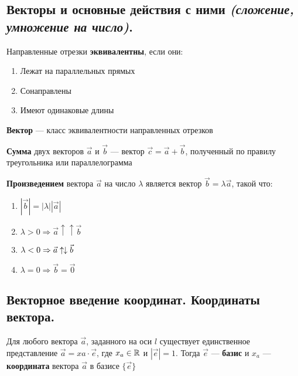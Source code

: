 \subsection{Векторы и основные действия с ними \textit{(сложение, умножение на число)}.}
\begin{definition}
    Направленные отрезки \textbf{эквивалентны}, если они:
    \begin{enumerate}
        \item Лежат на параллельных прямых
        \item Сонаправлены
        \item Имеют одинаковые длины
    \end{enumerate}
\end{definition}
\begin{definition}
    \textbf{Вектор} --- класс эквивалентности направленных отрезков
\end{definition}
\begin{definition}
    \textbf{Сумма} двух векторов $\vec a$ и $\vec b$ --- вектор $\vec c=\vec a + \vec b$, полученный по правилу треугольника или параллелограмма
\end{definition}
\begin{definition}
    \textbf{Произведением} вектора $\vec a$ на число $\lambda$ является вектор $\vec b=\lambda\vec a$, такой что:
    \begin{enumerate}
        \item $|\vec b|=|\lambda||\vec a|$
        \item $\lambda>0\Rightarrow \vec a\uparrow\uparrow\vec b$
        \item $\lambda<0\Rightarrow \vec a\uparrow\mathrel{\mspace{-1mu}}\downarrow\vec b$
        \item $\lambda=0\Rightarrow \vec b=\vec 0$
    \end{enumerate}
\end{definition}

\subsection{Векторное введение координат. Координаты вектора.}
Для любого вектора $\vec a$, заданного на оси $l$ существует единственное представление $\vec a = xa \cdot \vec e$, где $x_a \in \mathbb{R}$ и $|\vec e| = 1$. Тогда $\vec e$ --- \textbf{базис} и $x_a$ --- \textbf{координата} вектора $\vec a$ в базисе $\{\vec e\}$

